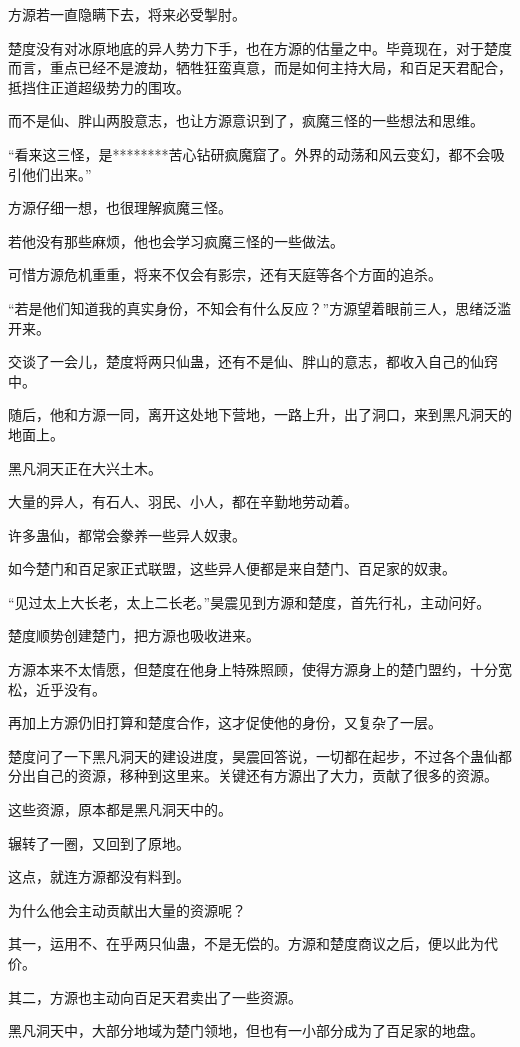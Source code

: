 \begin{this_body}
方源若一直隐瞒下去，将来必受掣肘。

楚度没有对冰原地底的异人势力下手，也在方源的估量之中。毕竟现在，对于楚度而言，重点已经不是渡劫，牺牲狂蛮真意，而是如何主持大局，和百足天君配合，抵挡住正道超级势力的围攻。

而不是仙、胖山两股意志，也让方源意识到了，疯魔三怪的一些想法和思维。

“看来这三怪，是********苦心钻研疯魔窟了。外界的动荡和风云变幻，都不会吸引他们出来。”

方源仔细一想，也很理解疯魔三怪。

若他没有那些麻烦，他也会学习疯魔三怪的一些做法。

可惜方源危机重重，将来不仅会有影宗，还有天庭等各个方面的追杀。

“若是他们知道我的真实身份，不知会有什么反应？”方源望着眼前三人，思绪泛滥开来。

交谈了一会儿，楚度将两只仙蛊，还有不是仙、胖山的意志，都收入自己的仙窍中。

随后，他和方源一同，离开这处地下营地，一路上升，出了洞口，来到黑凡洞天的地面上。

黑凡洞天正在大兴土木。

大量的异人，有石人、羽民、小人，都在辛勤地劳动着。

许多蛊仙，都常会豢养一些异人奴隶。

如今楚门和百足家正式联盟，这些异人便都是来自楚门、百足家的奴隶。

“见过太上大长老，太上二长老。”昊震见到方源和楚度，首先行礼，主动问好。

楚度顺势创建楚门，把方源也吸收进来。

方源本来不太情愿，但楚度在他身上特殊照顾，使得方源身上的楚门盟约，十分宽松，近乎没有。

再加上方源仍旧打算和楚度合作，这才促使他的身份，又复杂了一层。

楚度问了一下黑凡洞天的建设进度，昊震回答说，一切都在起步，不过各个蛊仙都分出自己的资源，移种到这里来。关键还有方源出了大力，贡献了很多的资源。

这些资源，原本都是黑凡洞天中的。

辗转了一圈，又回到了原地。

这点，就连方源都没有料到。

为什么他会主动贡献出大量的资源呢？

其一，运用不、在乎两只仙蛊，不是无偿的。方源和楚度商议之后，便以此为代价。

其二，方源也主动向百足天君卖出了一些资源。

黑凡洞天中，大部分地域为楚门领地，但也有一小部分成为了百足家的地盘。


\end{this_body}
